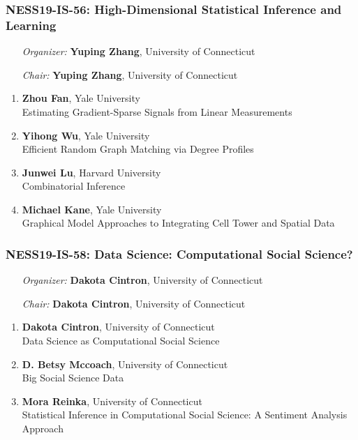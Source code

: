 \subsubsection*{NESS19-IS-56: High-Dimensional Statistical Inference and Learning}

\begin{enumerate}[align=left]
\item [\emph{Organizer:}] \textbf{Yuping Zhang}, University of Connecticut \\
\item [\emph{Chair:}] \textbf{Yuping Zhang}, University of Connecticut
\end{enumerate}

\begin{enumerate}
\item \textbf{Zhou Fan}, Yale University \\
Estimating Gradient-Sparse Signals from Linear Measurements
\item \textbf{Yihong Wu}, Yale University \\
Efficient Random Graph Matching via Degree Profiles
\item \textbf{Junwei Lu}, Harvard University \\
Combinatorial Inference
\item \textbf{Michael Kane}, Yale University \\
Graphical Model Approaches to Integrating Cell Tower and Spatial Data
\end{enumerate}

\subsubsection*{NESS19-IS-58: Data Science: Computational Social Science?}

\begin{enumerate}[align=left]
\item [\emph{Organizer:}] \textbf{Dakota Cintron}, University of Connecticut \\
\item [\emph{Chair:}] \textbf{Dakota Cintron}, University of Connecticut
\end{enumerate}

\begin{enumerate}
\item \textbf{Dakota Cintron}, University of Connecticut \\
Data Science as Computational Social Science
\item \textbf{D. Betsy Mccoach}, University of Connecticut \\
Big Social Science Data
\item \textbf{Mora Reinka}, University of Connecticut \\
Statistical Inference in Computational Social Science: A Sentiment Analysis Approach
\end{enumerate}

